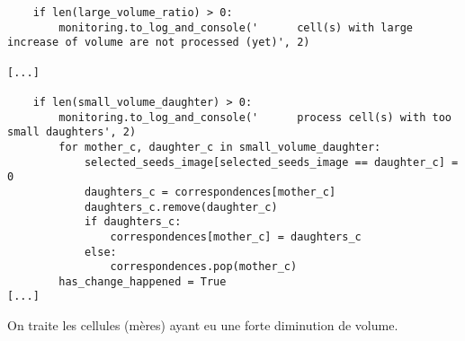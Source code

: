\documentclass{article}
\def \mycolor {red}
\begin{document}
\begin{verbatim}
    if len(large_volume_ratio) > 0:
        monitoring.to_log_and_console('      cell(s) with large increase of volume are not processed (yet)', 2)

[...]

    if len(small_volume_daughter) > 0:
        monitoring.to_log_and_console('      process cell(s) with too small daughters', 2)
        for mother_c, daughter_c in small_volume_daughter:
            selected_seeds_image[selected_seeds_image == daughter_c] = 0
            daughters_c = correspondences[mother_c]
            daughters_c.remove(daughter_c)
            if daughters_c:
                correspondences[mother_c] = daughters_c
            else:
                correspondences.pop(mother_c)
        has_change_happened = True
[...]
\end{verbatim}

\color{\mycolor}
On traite les cellules (m\`eres) ayant eu une forte diminution de volume.
\end{document}
